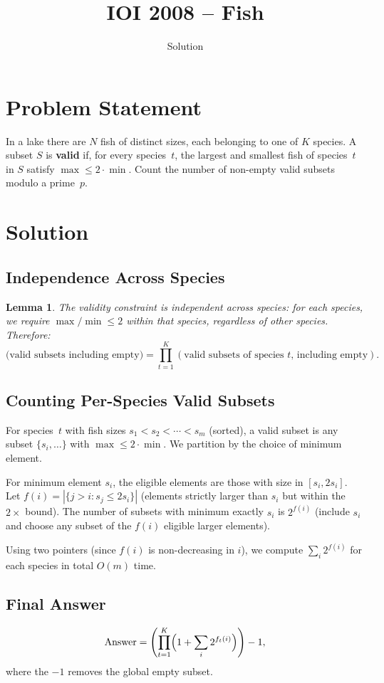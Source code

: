 \documentclass[11pt,a4paper]{article}
\title{IOI 2008 -- Fish}
\author{Solution}
\date{}
\newtheorem{lemma}[theorem]{Lemma}
\begin{document}
\maketitle

\section{Problem Statement}
In a lake there are $N$ fish of distinct sizes, each belonging to one of $K$ species. A subset $S$ is \textbf{valid} if, for every species~$t$, the largest and smallest fish of species~$t$ in $S$ satisfy $\max \le 2 \cdot \min$. Count the number of non-empty valid subsets modulo a prime~$p$.

\section{Solution}

\subsection{Independence Across Species}
\begin{lemma}
The validity constraint is independent across species: for each species, we require $\max / \min \le 2$ within that species, regardless of other species. Therefore:
\[
\text{(valid subsets including empty)} = \prod_{t=1}^{K} (\text{valid subsets of species } t \text{, including empty}).
\]
\end{lemma}

\subsection{Counting Per-Species Valid Subsets}
For species~$t$ with fish sizes $s_1 < s_2 < \cdots < s_m$ (sorted), a valid subset is any subset $\{s_i, \ldots\}$ with $\max \le 2 \cdot \min$. We partition by the choice of minimum element.

For minimum element $s_i$, the eligible elements are those with size in $[s_i, 2s_i]$. Let $f(i) = |\{j > i : s_j \le 2s_i\}|$ (elements strictly larger than $s_i$ but within the $2\times$ bound). The number of subsets with minimum exactly $s_i$ is $2^{f(i)}$ (include $s_i$ and choose any subset of the $f(i)$ eligible larger elements).

Using two pointers (since $f(i)$ is non-decreasing in $i$), we compute $\sum_i 2^{f(i)}$ for each species in total $O(m)$ time.

\subsection{Final Answer}
\[
\text{Answer} = \left(\prod_{t=1}^{K} \Bigl(1 + \sum_{i} 2^{f_t(i)}\Bigr)\right) - 1,
\]
where the $-1$ removes the global empty subset.
\end{document}
